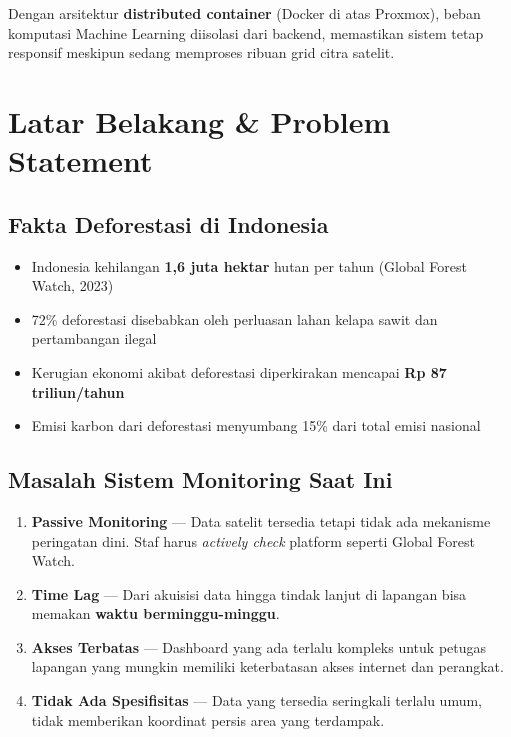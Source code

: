 \documentclass[11pt,a4paper]{article}
\begin{document}
Dengan arsitektur \textbf{distributed container} (Docker di atas Proxmox), beban komputasi Machine Learning diisolasi dari backend, memastikan sistem tetap responsif meskipun sedang memproses ribuan grid citra satelit.

\section{Latar Belakang \& Problem Statement}

\subsection{Fakta Deforestasi di Indonesia}

\begin{itemize}
    \item Indonesia kehilangan \textbf{1,6 juta hektar} hutan per tahun (Global Forest Watch, 2023)
    \item 72\% deforestasi disebabkan oleh perluasan lahan kelapa sawit dan pertambangan ilegal
    \item Kerugian ekonomi akibat deforestasi diperkirakan mencapai \textbf{Rp 87 triliun/tahun}
    \item Emisi karbon dari deforestasi menyumbang 15\% dari total emisi nasional
\end{itemize}

\subsection{Masalah Sistem Monitoring Saat Ini}

\begin{enumerate}[label=\textbf{\arabic*.}]
    \item \textbf{Passive Monitoring} --- Data satelit tersedia tetapi tidak ada mekanisme peringatan dini. Staf harus \textit{actively check} platform seperti Global Forest Watch.
    \item \textbf{Time Lag} --- Dari akuisisi data hingga tindak lanjut di lapangan bisa memakan \textbf{waktu berminggu-minggu}.
    \item \textbf{Akses Terbatas} --- Dashboard yang ada terlalu kompleks untuk petugas lapangan yang mungkin memiliki keterbatasan akses internet dan perangkat.
    \item \textbf{Tidak Ada Spesifisitas} --- Data yang tersedia seringkali terlalu umum, tidak memberikan koordinat persis area yang terdampak.
\end{enumerate}
\end{document}
